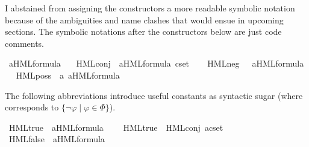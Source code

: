 \begin{isabellebody}
\begin{isamarkuptext}
I abstained from assigning the constructors a more readable symbolic notation because of the ambiguities and name clashes that would ensue in upcoming sections. The symbolic notations after the constructors below are just code comments.
\pagebreak%
\end{isamarkuptext}\isamarkuptrue%
\isamarkupfalse%
\ {\isacharparenleft}{\kern0pt}{\isacharprime}{\kern0pt}a{\isacharparenright}{\kern0pt}HML{\isacharunderscore}{\kern0pt}formula\ {\isacharequal}{\kern0pt}\isanewline
\ \ HML{\isacharunderscore}{\kern0pt}conj\ \ {\isacartoucheopen}{\isacharparenleft}{\kern0pt}{\isacharprime}{\kern0pt}a{\isacharparenright}{\kern0pt}HML{\isacharunderscore}{\kern0pt}formula\ cset{\isacartoucheclose}\ %
\isamarkupcmt{$\bigwedge \Phi$%
}\ \isanewline
{\isacharbar}{\kern0pt}\ HML{\isacharunderscore}{\kern0pt}neg\ \ \ {\isacartoucheopen}{\isacharparenleft}{\kern0pt}{\isacharprime}{\kern0pt}a{\isacharparenright}{\kern0pt}HML{\isacharunderscore}{\kern0pt}formula{\isacartoucheclose}\ %
\isamarkupcmt{$\neg\varphi$%
}\ \isanewline
{\isacharbar}{\kern0pt}\ HML{\isacharunderscore}{\kern0pt}poss\ \ {\isacartoucheopen}{\isacharprime}{\kern0pt}a{\isacartoucheclose}\ {\isacartoucheopen}{\isacharparenleft}{\kern0pt}{\isacharprime}{\kern0pt}a{\isacharparenright}{\kern0pt}HML{\isacharunderscore}{\kern0pt}formula{\isacartoucheclose}\ %
\isamarkupcmt{$\langle\alpha\rangle\varphi$%
}%
\begin{isamarkuptext}%
The following abbreviations introduce useful constants as syntactic sugar (where  corresponds to $\{ \neg\varphi \mid \varphi\in\Phi \}$).%
\end{isamarkuptext}\isamarkuptrue%
\isamarkupfalse%
\ HML{\isacharunderscore}{\kern0pt}true\ {\isacharcolon}{\kern0pt}{\isacharcolon}{\kern0pt}\ {\isacartoucheopen}{\isacharparenleft}{\kern0pt}{\isacharprime}{\kern0pt}a{\isacharparenright}{\kern0pt}HML{\isacharunderscore}{\kern0pt}formula{\isacartoucheclose}\ %
\isanewline
\ \ \ {\isacartoucheopen}HML{\isacharunderscore}{\kern0pt}true\ {\isasymequiv}\ HML{\isacharunderscore}{\kern0pt}conj\ {\isacharparenleft}{\kern0pt}acset\ {\isasymemptyset}{\isacharparenright}{\kern0pt}{\isacartoucheclose}\isanewline
{}\isamarkupfalse%
\ HML{\isacharunderscore}{\kern0pt}false\ {\isacharcolon}{\kern0pt}{\isacharcolon}{\kern0pt}\ {\isacartoucheopen}{\isacharparenleft}{\kern0pt}{\isacharprime}{\kern0pt}a{\isacharparenright}{\kern0pt}HML{\isacharunderscore}{\kern0pt}formula{\isacartoucheclose}\ %

\end{isabellebody}
